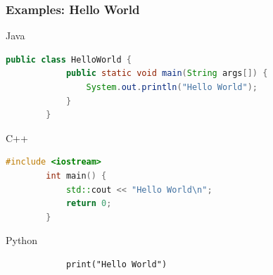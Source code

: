 \documentclass[10pt, a4paper]{beamer} %
\begin{document}
\begin{frame}\frametitle{Examples: Hello World}
    \begin{block}{Java}
    {
    \begin{lstlisting}[language=Java]
        public class HelloWorld {
            public static void main(String args[]) {
                System.out.println("Hello World");
            }
        }
    \end{lstlisting}    
    }
    \end{block}
    
    \begin{block}{C++}
    {
    \begin{lstlisting}[language=C++, morekeywords=include]
        #include <iostream>
        int main() {
            std::cout << "Hello World\n";
            return 0;
        }
    \end{lstlisting}    
    }
    \end{block}
    \framebreak
    \begin{block}{Python}
        \begin{lstlisting}
            print("Hello World")
        \end{lstlisting}
    \end{block}
    
\end{frame}
\end{document}
